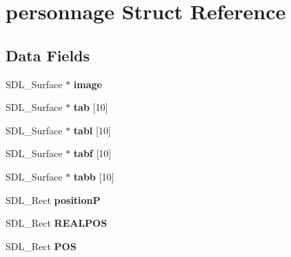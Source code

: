 \hypertarget{structpersonnage}{}\section{personnage Struct Reference}
\label{structpersonnage}
\subsection*{Data Fields}
\begin{DoxyCompactItemize}
\item 
S\+D\+L\+\_\+\+Surface $\ast$ {\bfseries image}\hypertarget{structpersonnage_a42c088a6a4d69c8ec60e84405927f885}{}\label{structpersonnage_a42c088a6a4d69c8ec60e84405927f885}

\item 
S\+D\+L\+\_\+\+Surface $\ast$ {\bfseries tab} \mbox{[}10\mbox{]}\hypertarget{structpersonnage_a917357059c44f1506fac89a0789a291d}{}\label{structpersonnage_a917357059c44f1506fac89a0789a291d}

\item 
S\+D\+L\+\_\+\+Surface $\ast$ {\bfseries tabl} \mbox{[}10\mbox{]}\hypertarget{structpersonnage_a43cc56de6490b833507c16216f400dd8}{}\label{structpersonnage_a43cc56de6490b833507c16216f400dd8}

\item 
S\+D\+L\+\_\+\+Surface $\ast$ {\bfseries tabf} \mbox{[}10\mbox{]}\hypertarget{structpersonnage_ae11dadf0300323ff2af026078b3cd5f6}{}\label{structpersonnage_ae11dadf0300323ff2af026078b3cd5f6}

\item 
S\+D\+L\+\_\+\+Surface $\ast$ {\bfseries tabb} \mbox{[}10\mbox{]}\hypertarget{structpersonnage_ac5218455607945e1a8e8062354101baf}{}\label{structpersonnage_ac5218455607945e1a8e8062354101baf}

\item 
S\+D\+L\+\_\+\+Rect {\bfseries positionP}\hypertarget{structpersonnage_aa27490c4ef33e8eb58c47da183ce1899}{}\label{structpersonnage_aa27490c4ef33e8eb58c47da183ce1899}

\item 
S\+D\+L\+\_\+\+Rect {\bfseries R\+E\+A\+L\+P\+OS}\hypertarget{structpersonnage_a6b255be9d0d997af833a31fc5d8d5000}{}\label{structpersonnage_a6b255be9d0d997af833a31fc5d8d5000}

\item 
S\+D\+L\+\_\+\+Rect {\bfseries P\+OS}\hypertarget{structpersonnage_a72b6ad5ddb8bdcb4a7fb8534a9e52569}{}\label{structpersonnage_a72b6ad5ddb8bdcb4a7fb8534a9e52569}


\end{DoxyCompactItemize}

